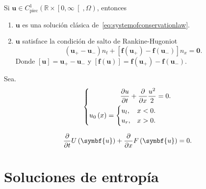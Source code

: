\begin{theorem}
	Si
	\begin{math}
		\symbf{u}\in
		C^{1}_{\text{piec}}
		\left(\mathbb{R}\times\left[0,\infty\right[,\Omega\right)
	\end{math},
	entonces
	\begin{enumerate}%
		\item

		      $\symbf{u}$ es una solución clásica
		      de~\eqref{eq:systemofconservationlaw}.

		\item

		      $\symbf{u}$ satisface la condición de salto de
		      Rankine-Hugoniot
		      \begin{equation*}
			      \left(\symbf{u}_{+}-\symbf{u}_{-}\right)
			      n_{t}+
			      \left[
				      \symbf{f}\left(\symbf{u}_{+}\right)-
				      \symbf{f}\left(\symbf{u}_{-}\right)
				      \right]
			      n_{x}=
			      \symbf{0}.
		      \end{equation*}
		      Donde
		      $\left[\symbf{u}\right]=\symbf{u}_{+}-\symbf{u}_{-}$ y
		      $\left[\symbf{f}\left(\symbf{u}\right)\right]=\symbf{f}\left(\symbf{u}_{+}\right)-\symbf{f}\left(\symbf{u}_{-}\right)$.
	\end{enumerate}
\end{theorem}

\begin{example}[]
	Sea.
	\begin{equation*}
		\left\{
		\begin{aligned}
			\diffp{u}{t}+
			\diffp{}{x}
			\frac{u^{2}}{2} & =
			0.                  \\
			u_{0}\left(x\right)=
			\begin{cases}
				u_{l}, & x<0. \\
				u_{r}, & x>0.
			\end{cases}
		\end{aligned}
		\right.
	\end{equation*}
\end{example}

\begin{equation*}
	\diffp{}{t}
	U\left(\symbf{u}\right)+
	\diffp{}{x}
	F\left(\symbf{u}\right)=
	0.
\end{equation*}

\section{Soluciones de entropía}

